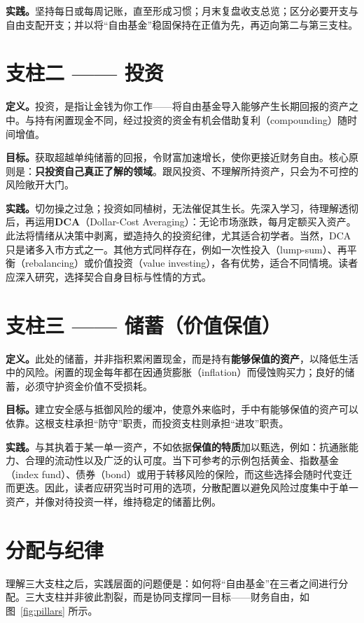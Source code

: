 \documentclass[11pt,a4paper,twocolumn]{article}
\begin{document}
\textbf{实践。}坚持每日或每周记账，直至形成习惯；月末复盘收支总览；区分必要开支与自由支配开支；并以将“自由基金”稳固保持在正值为先，再迈向第二与第三支柱。

\section{支柱二 —— 投资}
\textbf{定义。}投资，是指让金钱为你工作——将自由基金导入能够产生长期回报的资产之中。与持有闲置现金不同，经过投资的资金有机会借助复利（compounding）随时间增值。

\textbf{目标。}获取超越单纯储蓄的回报，令财富加速增长，使你更接近财务自由。核心原则是：\textbf{只投资自己真正了解的领域}。跟风投资、不理解所持资产，只会为不可控的风险敞开大门。

\textbf{实践。}切勿操之过急；投资如同植树，无法催促其生长。先深入学习，待理解透彻后，再运用\textbf{DCA}（Dollar-Cost Averaging）：无论市场涨跌，每月定额买入资产。此法将情绪从决策中剥离，塑造持久的投资纪律，尤其适合初学者。当然，DCA只是诸多入市方式之一。其他方式同样存在，例如一次性投入（lump-sum）、再平衡（rebalancing）或价值投资（value investing），各有优势，适合不同情境。读者应深入研究，选择契合自身目标与性情的方式。

\section{支柱三 —— 储蓄（价值保值）}
\textbf{定义。}此处的储蓄，并非指积累闲置现金，而是持有\textbf{能够保值的资产}，以降低生活中的风险。闲置的现金每年都在因通货膨胀（inflation）而侵蚀购买力；良好的储蓄，必须守护资金价值不受损耗。

\textbf{目标。}建立安全感与抵御风险的缓冲，使意外来临时，手中有能够保值的资产可以依靠。这根支柱承担“防守”职责，而投资支柱则承担“进攻”职责。

\textbf{实践。}与其执着于某一单一资产，不如依据\textbf{保值的特质}加以甄选，例如：抗通胀能力、合理的流动性以及广泛的认可度。当下可参考的示例包括黄金、指数基金（index fund）、债券（bond）或用于转移风险的保险，而这些选择会随时代变迁而更迭。因此，读者应研究当时可用的选项，分散配置以避免风险过度集中于单一资产，并像对待投资一样，维持稳定的储蓄比例。

\section{分配与纪律}
理解三大支柱之后，实践层面的问题便是：如何将“自由基金”在三者之间进行分配。三大支柱并非彼此割裂，而是协同支撑同一目标——财务自由，如图~\ref{fig:pillars} 所示。
\end{document}
